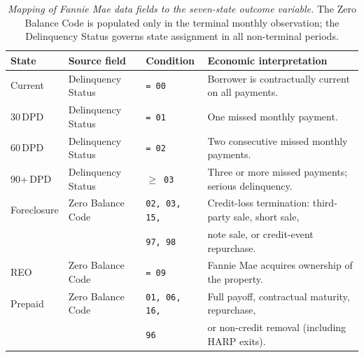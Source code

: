\begin{table}[htbp]
  \centering
  \small
  \begin{tabularx}{\textwidth}{@{} l l l X @{}}
    \toprule
    \textbf{State} & \textbf{Source field} & \textbf{Condition}
      & \textbf{Economic interpretation} \\
    \midrule
    Current
      & Delinquency Status & \texttt{= 00}
      & Borrower is contractually current on all payments. \\[3pt]
    30\,DPD
      & Delinquency Status & \texttt{= 01}
      & One missed monthly payment. \\[3pt]
    60\,DPD
      & Delinquency Status & \texttt{= 02}
      & Two consecutive missed monthly payments. \\[3pt]
    90+\,DPD
      & Delinquency Status & \texttt{$\geq$ 03}
      & Three or more missed payments; serious delinquency. \\[3pt]
    Foreclosure
      & Zero Balance Code  & \texttt{02, 03, 15,}
      & Credit-loss termination: third-party sale, short sale, \\
      &                    & \texttt{97, 98}
      & note sale, or credit-event repurchase. \\[3pt]
    REO
      & Zero Balance Code  & \texttt{= 09}
      & Fannie Mae acquires ownership of the property. \\[3pt]
    Prepaid
      & Zero Balance Code  & \texttt{01, 06, 16,}
      & Full payoff, contractual maturity, repurchase, \\
      &                    & \texttt{96}
      & or non-credit removal (including HARP exits). \\
    \bottomrule
  \end{tabularx}
  \caption[Mapping of Fannie Mae data fields to the seven-state
  outcome variable]%
  {\textit{Mapping of Fannie Mae data fields to the seven-state
  outcome variable.}  The Zero Balance Code is populated only in the
  terminal monthly observation; the Delinquency Status governs state
  assignment in all non-terminal periods.}
  \label{tab:state-mapping}
\end{table}

